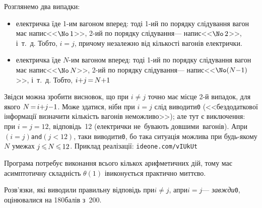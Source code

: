 \Tutorial	Розглянемо два випадки: 

\begin{itemize}
\item
електричка їде \mbox{1-им} вагоном вперед: тоді 
\mbox{1-ий} по порядку слідування вагон має напис\nolinebreak[2] <<$\No\,1$>>, 
\mbox{2-ий} по порядку слідування\nolinebreak[3] --- напис\nolinebreak[2] <<$\No\,2$>>, 
і~т.~д. Тобто, ${i{=}j}$, причому незалежно від кількості вагонів електрички.
\item
електричка їде \mbox{$N$-им} вагоном вперед: тоді 
\mbox{1-ий} по порядку слідування вагон має напис\nolinebreak[2] <<$\No\,N$>>, 
\mbox{2-ий} по порядку слідування\nolinebreak[3] --- напис\nolinebreak[2] <<$\No(N{-}1)$>>, 
і~т.~д. Тобто, ${i{+}j}\dib{{=}}{N{+}1}$
\end{itemize}

Звідси можна зробити висновок, що при $i{\neq}j$ точно має місце \mbox{2-й} випадок, для якого $N\dib{{=}}{i{+}j{-}1}$. Може здатися, ніби при $i{=}j$ слід виводити\nolinebreak[3] \texttt{0} (<<без\nolinebreak[1] додаткової інформації визначити кількість вагонів неможливо>>); але тут є виключення: при $i{=}j{=}12$, відповідь~12 (електрички не~бувають довшими~вагонів). А\nolinebreak[3] при\nolinebreak[1] $({i{=}j})$\nolinebreak[3] \texttt{and}\nolinebreak[2] $({j{<}12})$, таки виводити\nolinebreak[3] \texttt{0}, бо така ситуація можлива при будь-якому\nolinebreak[3] $N$ 
у\nolinebreak[3] межах $j\dib{{\<}}N\dib{{\<}}12$.
Приклад реалізації: \verb"ideone.com/vIUkUt"

Програма потребує виконання всього кількох арифметичних дій, тому має асимптотичну складність $\theta(1)$ і\nolinebreak[3] виконується практично миттєво.

Розв'язки, які виводили правильну відповідь при\nolinebreak[2] $i{\neq}j$, а\nolinebreak[3] при\nolinebreak[2]  $i{=}j$\nolinebreak[3] --- \emph{завжди}\nolinebreak[3] \texttt{0}, оцінювалися на 180\nolinebreak[3] балів з~200.


